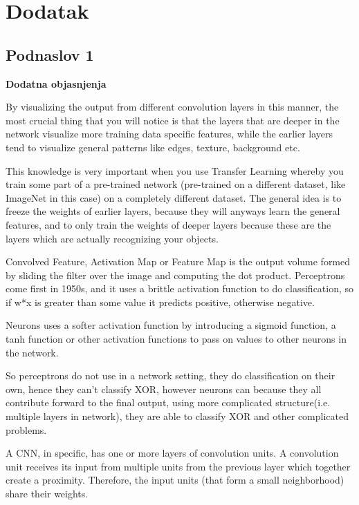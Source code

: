 \documentclass[a4paper]{article}
\begin{document}
\appendix
 


\appendix
\section{Dodatak}
\subsection{Podnaslov 1}

\textbf{Dodatna objasnjenja} %


By visualizing the output from different convolution layers in this manner, the most crucial thing that you will notice is that the layers that are deeper in the network visualize more training data specific features, while the earlier layers tend to visualize general patterns like edges, texture, background etc.

This knowledge is very important when you use Transfer Learning whereby you train some part of a pre-trained network (pre-trained on a different dataset, like ImageNet in this case) on a completely different dataset. The general idea is to freeze the weights of earlier layers, because they will anyways learn the general features, and to only train the weights of deeper layers because these are the layers which are actually recognizing your objects.

Convolved Feature, Activation Map or Feature Map is the output volume formed by sliding the filter over the image and computing the dot product.
Perceptrons come first in 1950s, and it uses a brittle activation function to do classification, so if w*x is greater than some value it predicts positive, otherwise negative.

Neurons uses a softer activation function by introducing a sigmoid function, a tanh function or other activation functions to pass on values to other neurons in the network.

So perceptrons do not use in a network setting, they do classification on their own, hence they can’t classify XOR, however neurons can because they all contribute forward to the final output, using more complicated structure(i.e. multiple layers in network), they are able to classify XOR and other complicated problems.

A CNN, in specific, has one or more layers of convolution units. A convolution unit receives its input from multiple units from the previous layer which together create a proximity. Therefore, the input units (that form a small neighborhood) share their weights.
\end{document}
